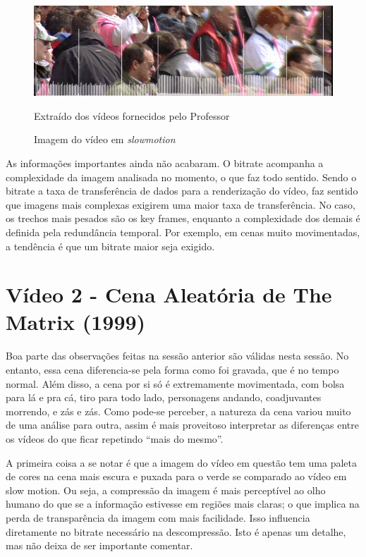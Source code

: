 \begin{figure}[H]
    \centering
    \caption{Imagem do vídeo em \textit{slowmotion}}
    \label{fig:imagem10}
    
    \includegraphics[scale=0.5]{Documeto/1-ElementosTextuais/images/10.png}

    \small
    Extraído dos vídeos fornecidos pelo Professor
\end{figure}

\paragrafo As informações importantes ainda não acabaram. O bitrate acompanha a complexidade da imagem analisada no momento, o que faz todo sentido. Sendo o bitrate a taxa de transferência de dados para a renderização do vídeo, faz sentido que imagens mais complexas exigirem uma maior taxa de transferência. No caso, os trechos mais pesados são os key frames, enquanto a complexidade dos demais é definida pela redundância temporal. Por exemplo, em cenas muito movimentadas, a tendência é que um bitrate maior seja exigido.

\section{Vídeo 2 - Cena Aleatória de The Matrix (1999)}

Boa parte das observações feitas na sessão anterior são válidas nesta sessão. No entanto, essa cena diferencia-se pela forma como foi gravada, que é no tempo normal. Além disso, a cena por si só é extremamente movimentada, com bolsa para lá e pra cá, tiro para todo lado, personagens andando, coadjuvantes morrendo, e zás e zás. Como pode-se perceber, a natureza da cena variou muito de uma análise para outra, assim é mais proveitoso interpretar as diferenças entre os vídeos do que ficar repetindo “mais do mesmo”.

\paragrafo A primeira coisa a se notar é que a imagem do vídeo em questão tem uma paleta de cores na cena mais escura e puxada para o verde se comparado ao vídeo em slow motion. Ou seja, a compressão da imagem é mais perceptível ao olho humano do que se a informação estivesse em regiões mais claras; o que implica na perda de transparência da imagem com mais facilidade. Isso influencia diretamente no bitrate necessário na descompressão. Isto é apenas um detalhe, mas não deixa de ser importante comentar.

